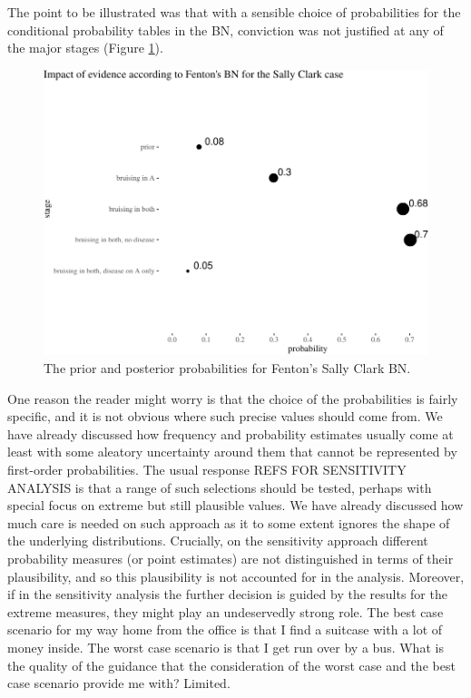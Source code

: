 \documentclass[
  10pt,
  dvipsnames,enabledeprecatedfontcommands]{scrartcl}
\begin{document}
The point to be illustrated was that with a sensible choice of
probabilities for the conditional probability tables in the BN,
conviction was not justified at any of the major stages (Figure
\ref{fig:SCfentonTable}).

\begin{figure}[H]

\begin{center}\includegraphics[width=1\linewidth]{chapter-outline_files/figure-latex/SCfentonTable2-1} \end{center}

\caption{The prior and posterior probabilities for Fenton's Sally Clark BN.}

\label{fig:SCfentonTable}

\end{figure}

One reason the reader might worry is that the choice of the
probabilities is fairly specific, and it is not obvious where such
precise values should come from. We have already discussed how frequency
and probability estimates usually come at least with some aleatory
uncertainty around them that cannot be represented by first-order
probabilities. The usual response REFS FOR SENSITIVITY ANALYSIS is that
a range of such selections should be tested, perhaps with special focus
on extreme but still plausible values. We have already discussed how
much care is needed on such approach as it to some extent ignores the
shape of the underlying distributions. Crucially, on the sensitivity
approach different probability measures (or point estimates) are not
distinguished in terms of their plausibility, and so this plausibility
is not accounted for in the analysis. Moreover, if in the sensitivity
analysis the further decision is guided by the results for the extreme
measures, they might play an undeservedly strong role. The best case
scenario for my way home from the office is that I find a suitcase with
a lot of money inside. The worst case scenario is that I get run over by
a bus. What is the quality of the guidance that the consideration of the
worst case and the best case scenario provide me with? Limited.
\end{document}
